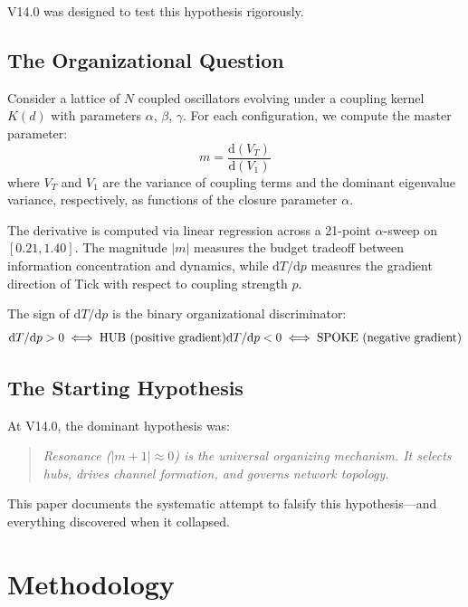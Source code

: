 \documentclass[11pt,a4paper,oneside]{report}
\newcommand{\dTdp}{\ensuremath{\mathrm{d}T/\mathrm{d}p}}
\begin{document}
V14.0 was designed to test this hypothesis rigorously.

\section{The Organizational Question}

Consider a lattice of $N$ coupled oscillators evolving under a coupling kernel
$K(d)$ with parameters $\alpha$, $\beta$, $\gamma$. For each configuration,
we compute the master parameter:
\begin{equation}
  m = \frac{\mathrm{d}(V_T)}{\mathrm{d}(V_1)}
  \label{eq:m}
\end{equation}
where $V_T$ and $V_1$ are the variance of coupling terms and the dominant
eigenvalue variance, respectively, as functions of the closure parameter $\alpha$.

The derivative is computed via linear regression across a 21-point $\alpha$-sweep
on $[0.21, 1.40]$. The magnitude $|m|$ measures the budget tradeoff between
information concentration and dynamics, while $\dTdp$ measures the gradient
direction of Tick with respect to coupling strength $p$.

The sign of $\dTdp$ is the binary organizational discriminator:
\begin{equation}
  \dTdp > 0 \;\Longleftrightarrow\; \text{HUB (positive gradient)}\\
  \dTdp < 0 \;\Longleftrightarrow\; \text{SPOKE (negative gradient)}
\end{equation}

\section{The Starting Hypothesis}

At V14.0, the dominant hypothesis was:
\begin{quote}
  \textit{Resonance ($|m+1|\approx 0$) is the universal organizing mechanism.
  It selects hubs, drives channel formation, and governs network topology.}
\end{quote}

This paper documents the systematic attempt to falsify this hypothesis---and
everything discovered when it collapsed.

\chapter{Methodology}
\label{ch:methodology}
\end{document}
